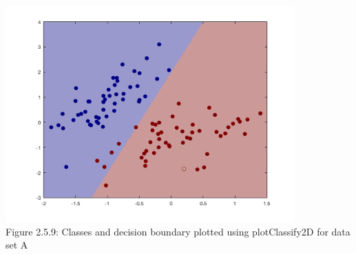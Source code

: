 \documentclass[]{scrreprt}   %
\begin{document}
\begin{center}
		\includegraphics[width=30em,keepaspectratio]{p5figure9.png}\\
	{Figure 2.5.9: Classes and decision boundary plotted using plotClassify2D for data set A}
	

\end{center}
\end{document}
